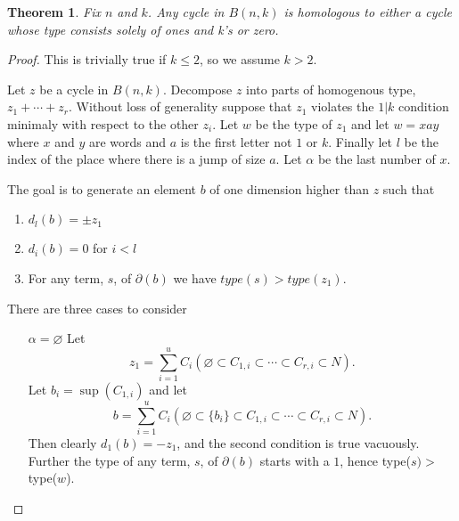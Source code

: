 \documentclass{amsart}
\newtheorem{theorem}{Theorem}[section]
\begin{document}
  \begin{theorem} Fix $n$ and $k$. Any cycle in $B(n, k)$ is homologous to either a cycle whose type consists solely of ones and
    k's or zero.
  \end{theorem}
  \begin{proof} 
    This is trivially true if $k \le 2$, so we assume $k > 2$.

Let $z$ be a cycle in $B(n, k)$. Decompose $z$ into parts of homogenous type, $z_1 + \cdots + z_r$. 
    Without loss of generality suppose that $z_1$ violates the $1|k$ condition minimaly with respect to the other $z_i$.
    Let $w$ be the type of $z_1$ and let $w = xay$ where $x$ and $y$ are words and $a$ is the first letter not 
    $1$ or $k$. Finally let $l$ be the index of the place where there is a jump of size $a$. Let $\alpha$ be the last
    number of $x$.

    The goal is to generate an element $b$ of one dimension higher than $z$ such that 
    \begin{enumerate}
      \item $d_{l} (b) = \pm z_1$
      \item $d_i (b) = 0$ for $i < l$
      \item For any term, $s$,  of $\partial(b)$ we have $type(s) > type(z_1)$.
    \end{enumerate}
    There are three cases to consider   
    \begin{enumerate}
      \item[$\alpha=\varnothing$]
        Let $$z_1 = \sum_{i=1}^u C_i (\varnothing \subset C_{1,i} \subset \cdots \subset C_{r,i} \subset 
        N).$$ Let $b_i =\sup(C_{1,i})$
        and let $$b = \sum_{i=1}^u C_i (\varnothing \subset \{b_i\} \subset C_{1,i} \subset 
        \cdots \subset C_{r,i} \subset N).$$ Then clearly $d_1(b) = -z_1$, and the second condition is true
        vacuously. Further the type of any term, $s$,  of $\partial(b)$ starts with a $1$, hence type($s) >$ type($w$).
   

\end{enumerate}
\end{proof}
\end{document}
